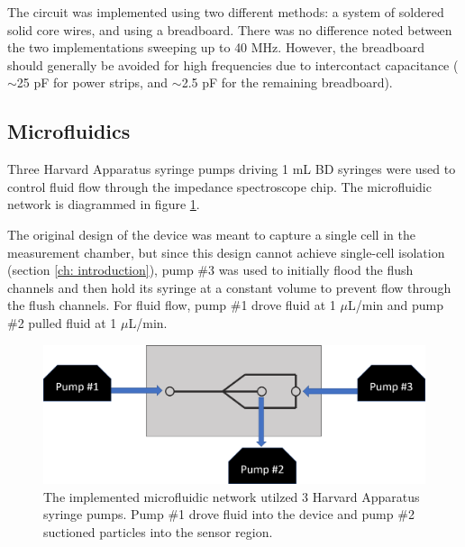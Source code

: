 \par The circuit was implemented using two different methods: a system of soldered solid core wires, and using a breadboard. There was no difference noted between the two implementations sweeping up to 40 MHz. However, the breadboard should generally be avoided for high frequencies due to intercontact capacitance ($\sim$25 pF for power strips, and $\sim$2.5 pF for the remaining breadboard).


\subsection{Microfluidics}

\par Three Harvard Apparatus syringe pumps driving 1 mL BD syringes were used to control fluid flow through the impedance spectroscope chip. The microfluidic network is diagrammed in figure \ref{fig:ufluidic_network}.

\par The original design of the device was meant to capture a single cell in the measurement chamber, but since this design cannot achieve single-cell isolation (section \ref{ch: introduction}), pump \#3 was used to initially flood the flush channels and then hold its syringe at a constant volume to prevent flow through the flush channels. For fluid flow, pump \#1 drove fluid at 1 $\mu$L/min and pump \#2 pulled fluid at 1 $\mu$L/min. 


\begin{figure}[h]
    \centering
    \includegraphics[width=\textwidth]{images/fluidics_system.png}
    \caption[The implemented microfluidic network]{The implemented microfluidic network utilzed 3 Harvard Apparatus syringe pumps. Pump \#1 drove fluid into the device and pump \#2 suctioned particles into the sensor region.}
    \label{fig:ufluidic_network}
\end{figure}

